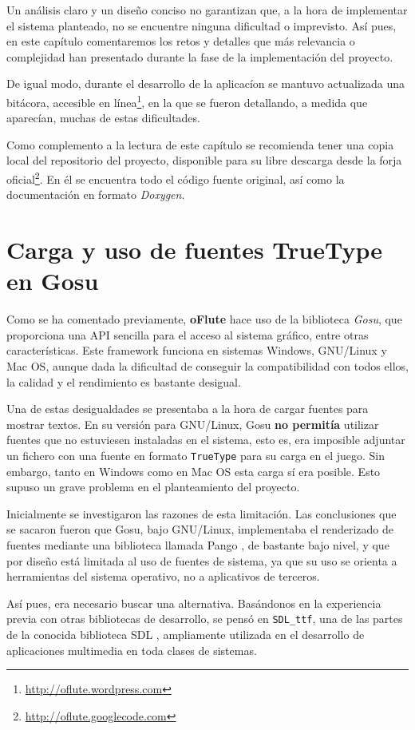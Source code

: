 Un análisis claro y un diseño conciso no garantizan que, a la hora de
implementar el sistema planteado, no se encuentre ninguna dificultad o
imprevisto. Así pues, en este capítulo comentaremos los retos y detalles que más
relevancia o complejidad han presentado durante la fase de la implementación del
proyecto.

De igual modo, durante el desarrollo de la aplicacíon se mantuvo actualizada una
bitácora, accesible en línea\footnote{\url{http://oflute.wordpress.com}},
en la que se fueron detallando, a medida que aparecían, muchas de estas
dificultades. 

Como complemento a la lectura de este capítulo se recomienda tener una copia
local del repositorio del proyecto, disponible para su libre descarga desde la
forja oficial\footnote{\url{http://oflute.googlecode.com}}. En él se encuentra
todo el código fuente original, así como la documentación en formato
\textit{Doxygen}.

\section{Carga y uso de fuentes TrueType en Gosu}

Como se ha comentado previamente, \textbf{oFlute} hace uso de la biblioteca
\textit{Gosu}, que proporciona una API sencilla para el acceso al sistema
gráfico, entre otras características. Este framework funciona en sistemas
Windows, GNU/Linux y Mac OS, aunque dada la dificultad de conseguir la
compatibilidad con todos ellos, la calidad y el rendimiento es bastante
desigual.

Una de estas desigualdades se presentaba a la hora de cargar fuentes para
mostrar textos. En su versión para GNU/Linux, Gosu \textbf{no permitía} utilizar
fuentes que no estuviesen instaladas en el sistema, esto es, era imposible
adjuntar un fichero con una fuente en formato \texttt{TrueType}
 para su carga en el juego. Sin embargo, tanto en
Windows como en Mac OS esta carga sí era posible. Esto supuso un grave problema
en el planteamiento del proyecto.

Inicialmente se investigaron las razones de esta limitación. Las conclusiones
que se sacaron fueron que Gosu, bajo GNU/Linux, implementaba el renderizado de
fuentes mediante una biblioteca llamada Pango , de
bastante bajo nivel, y que por diseño está limitada al uso de fuentes de
sistema, ya que su uso se orienta a herramientas del sistema operativo, no a
aplicativos de terceros. 

Así pues, era necesario buscar una alternativa. Basándonos en la experiencia
previa con otras bibliotecas de desarrollo, se pensó en \texttt{SDL\_ttf}, una de
las partes de la conocida biblioteca SDL , ampliamente
utilizada en el desarrollo de aplicaciones multimedia en toda clases de
sistemas.
